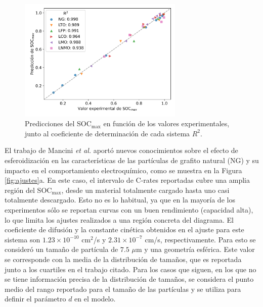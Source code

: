 \begin{figure}[h!]
    \centering
    \includegraphics[width=0.7\textwidth]{FastCharging/un/resultados/ajuste/pred_vs_exp.png}
    \caption{Predicciones del SOC$_{\max}$ en función de los valores 
    experimentales, junto al coeficiente de determinación de cada sistema $R^2$.}
    \label{fig:pred_vs_exp}
\end{figure}

El trabajo de Mancini \textit{et al.} \cite{mancini2022} aportó nuevos 
conocimientos sobre el efecto de esferoidización en las características de las
partículas de grafito natural (NG) y su impacto en el comportamiento 
electroquímico, como se muestra en la Figura \ref{fig:ajustes}a. En este caso, 
el intervalo de C-rates reportadas cubre una amplia región del SOC$_{\max}$, desde un 
material totalmente cargado hasta uno casi totalmente descargado. Esto no es lo 
habitual, ya que en la mayoría de los experimentos sólo se reportan curvas con un 
buen rendimiento (capacidad alta), lo que limita los ajustes realizados a una 
región concreta del diagrama. El coeficiente de difusión y la constante cinética 
obtenidos en el ajuste para este sistema son $1.23\times10^{-10}$ cm$^2$/s y 
$2.31\times10^{-7}$ cm/s, respectivamente. Para esto se consideró un tamaño
de partícula de $7.5$ $\mu$m y una geometría esférica. Este valor se corresponde
con la media de la distribución de tamaños, que es reportada junto a los 
cuartiles en el trabajo citado. Para los casos que siguen, en los que no se
tiene información precisa de la distribución de tamaños, se considera el punto
medio del rango reportado para el tamaño de las partículas y se utiliza para 
definir el parámetro $d$ en el modelo.

